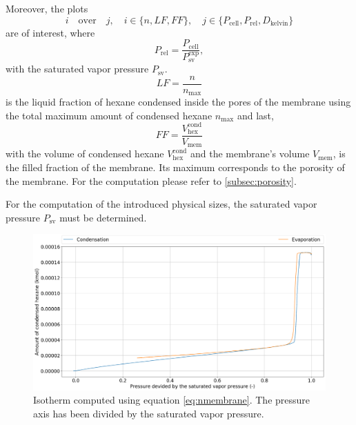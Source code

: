 \documentclass[../thesis.tex]{subfiles}
\begin{document}
        Moreover, the plots
        \begin{equation}
            i \quad \mathrm{over} \quad j,\quad i\in \{n,LF,FF\}, \quad j\in \{P_\mathrm{cell},P_\mathrm{rel},D_\mathrm{kelvin}\}
        \end{equation}
        are of interest, where
        \begin{equation}
            P_\mathrm{rel} = \frac{P_\mathrm{cell}}{P_\mathrm{sv}^\mathrm{exp}},
        \end{equation}
        with the saturated vapor pressure $P_\mathrm{sv}$.
        \begin{equation}
            LF = \frac{n}{n_\mathrm{max}}
        \end{equation}
        is the liquid fraction of hexane condensed inside the pores of the membrane using the total maximum amount of condensed hexane $n_\mathrm{max}$ and last,
        \begin{equation}
            FF = \frac{V_\mathrm{hex}^\mathrm{cond}}{V_\mathrm{mem}}
        \end{equation}
        with the volume of condensed hexane $V_\mathrm{hex}^\mathrm{cond}$ and the membrane's volume $V_\mathrm{mem}$, is the filled fraction of the membrane. Its maximum corresponds to the porosity of the membrane. For the computation please refer to \cref{subsec:porosity}.

        For the computation of the introduced physical sizes, the saturated vapor pressure $P_\mathrm{sv}$ must be determined.

        \begin{figure}[ht]
            \centering
            \includegraphics[width=\textwidth]{images/prel_isotherm_computation.png}
            \caption{Isotherm computed using equation \cref{eq:nmembrane}. The pressure axis has been divided by the saturated vapor pressure. }
            \label{fig:computed-isotherm}
        \end{figure}
\end{document}
